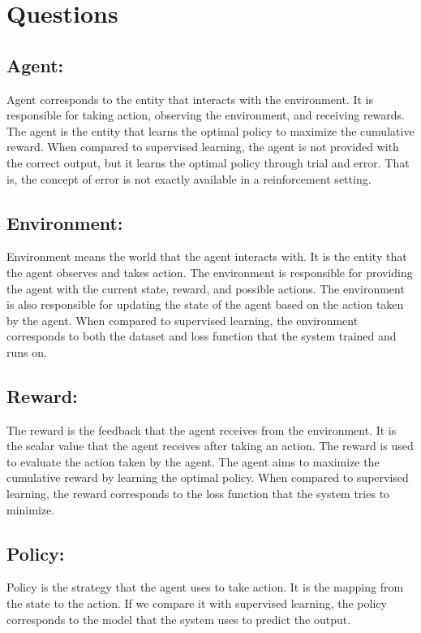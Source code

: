 \documentclass{assignment}
\date{\today}
\begin{document}
\section{Questions}
\subsection{Agent: }
Agent corresponds to the entity that interacts with the environment. It is responsible for taking action, observing the environment, and receiving rewards. The agent is the entity that learns the optimal policy to maximize the cumulative reward. When compared to supervised learning, the agent is not provided with the correct output, but it learns the optimal policy through trial and error. That is, the concept of error is not exactly available in a reinforcement setting.

\subsection{Environment: }
Environment means the world that the agent interacts with. It is the entity that the agent observes and takes action. The environment is responsible for providing the agent with the current state, reward, and possible actions. The environment is also responsible for updating the state of the agent based on the action taken by the agent. When compared to supervised learning, the environment corresponds to both the dataset and loss function that the system trained and runs on.

\subsection{Reward: }
The reward is the feedback that the agent receives from the environment. It is the scalar value that the agent receives after taking an action. The reward is used to evaluate the action taken by the agent. The agent aims to maximize the cumulative reward by learning the optimal policy. When compared to supervised learning, the reward corresponds to the loss function that the system tries to minimize.

\subsection{Policy: }
Policy is the strategy that the agent uses to take action. It is the mapping from the state to the action. If we compare it with supervised learning, the policy corresponds to the model that the system uses to predict the output.
\end{document}
